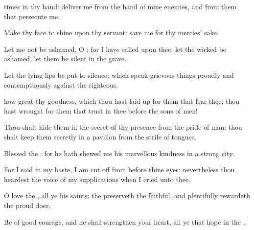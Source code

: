 {times
{} in thy
hand:
deliver me from the
hand of mine
enemies, and from them that
persecute me.
\par }{\Q {}Make thy
face to
shine upon thy
servant:
save me for thy
mercies’ sake.
\par }{\Q {}Let me not be
ashamed, O
{}; for I have
called upon thee: let the
wicked be
ashamed,
{} let them be
silent in the
grave.
\par }{\Q {}Let the
lying
lips be put to
silence; which
speak
grievous things
proudly and
contemptuously against the
righteous.
\par }{\BB \par }{\Q {} how
great
{} thy
goodness, which thou hast laid
up for them that
fear thee;
{} thou hast
wrought for them that
trust in thee before the
sons of
men!
\par }{\Q {}Thou shalt
hide them in the
secret of thy
presence from the
pride of
man: thou shalt keep them
secretly in a
pavilion from the
strife of
tongues.
\par }{\Q {}Blessed
{} the
{}: for he hath shewed me his
marvellous
kindness in a
strong
city.
\par }{\Q {}For I
said in my
haste, I am cut
off from
before thine
eyes:
nevertheless thou
heardest the
voice of my
supplications when I
cried unto thee.
\par }{\Q {}O
love the
{}, all ye his
saints:
{} the
{}
preserveth the
faithful, and
plentifully
rewardeth the
proud
doer.
\par }{\Q {}Be of good
courage, and he shall
strengthen your
heart, all ye that
hope in the
{}.

}
